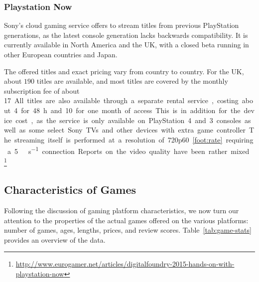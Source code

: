

\subsubsection{Playstation Now}

Sony's cloud gaming service offers to stream titles from previous PlayStation generations, as the latest console generation lacks backwards compatibility. It is currently available in North America and the UK, with a closed beta running in other European countries and Japan.

The offered titles and exact pricing vary from country to country. For the UK, about $190$ titles are available, and most titles are covered by the monthly subscription fee of about \SI{17}[\EUR]. All titles are also available through a separate rental service, costing about \SI{4}[\EUR] for \SI{48}{\hour} and \SI{10}[\EUR] for one month of access. This is in addition for the device cost, as the service is only available on  PlayStation 4 and 3 consoles as well as some select Sony TVs and other devices with extra game controller.


The streaming itself is performed at a resolution of 720p60\cref{foot:rate} requiring a \SI{5}{\mega\bit\per\second} connection. Reports on the video quality have been rather mixed.\footnote{\url{http://www.eurogamer.net/articles/digitalfoundry-2015-hands-on-with-playstation-now}} %





\subsection{Characteristics of Games}

Following the discussion of gaming platform characteristics, we now turn our attention to the properties of the actual games offered on the various platforms: number of games, ages, lengths, prices, and review scores. Table~\ref{tab:game-stats} provides an overview of the data.

